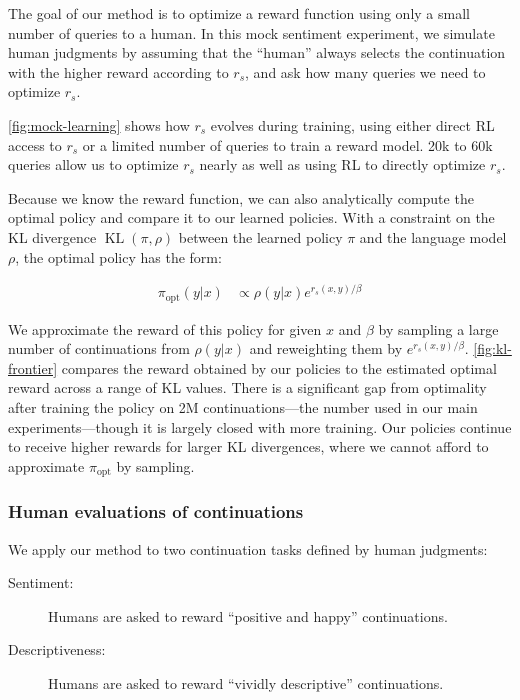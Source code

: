 The goal of our method is to optimize a reward function using only a small number of queries to a human. In this mock sentiment experiment, we simulate human judgments by assuming that the ``human'' always selects the continuation with the higher reward according to $r_s$, and ask how many queries we need to optimize $r_s$.

\ref{fig:mock-learning} shows how $r_s$ evolves during training, using either direct RL access to $r_s$ or a limited number of queries to train a reward model. 20k to 60k queries allow us to optimize $r_s$ nearly as well as using RL to directly optimize $r_s$.

Because we know the reward function, we can also analytically compute the optimal policy and compare it to our learned policies.
\newcommand{\popt}[2]{\pi_{\textrm{opt}}(#1 #2)} With a constraint on the KL divergence $\operatorname{KL}(\pi, \rho)$ between the learned policy $\pi$
and the language model $\rho$,
the optimal policy has the form:

\begin{align*}
\pi_\textrm{opt}(y | x) &\propto \rho(y | x) e^{r_s(x,y) / \beta }
\end{align*}

We approximate the reward of this policy for given $x$ and $\beta$
by sampling a large number of continuations from $\rho(y|x)$ and reweighting them by $e^{r_s(x,y) / \beta}$.
\ref{fig:kl-frontier} compares the reward obtained by our policies to the estimated optimal reward across a range of KL values. There is a significant gap from optimality after training the policy on 2M continuations---the number used in our main experiments---though it is largely closed with more training. Our policies continue to receive higher rewards for larger KL divergences, where we cannot afford to approximate $\pi_\textrm{opt}$ by sampling.

\subsubsection{Human evaluations of continuations\label{sec:style}}

We apply our method to two continuation tasks defined by human judgments:

\begin{description}
\item[Sentiment:] Humans are asked to reward ``positive and happy'' continuations.
\item[Descriptiveness:] Humans are asked to reward ``vividly descriptive'' continuations.
\end{description}

